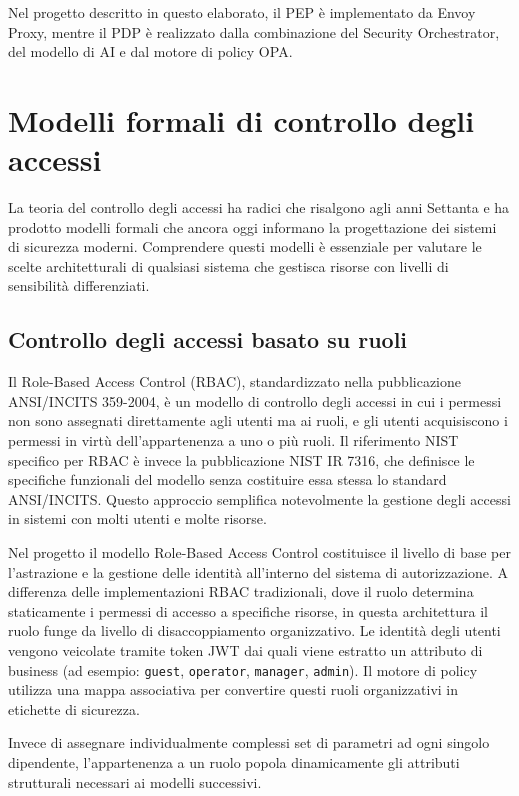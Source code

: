 Nel progetto descritto in questo elaborato, il PEP è implementato da Envoy Proxy, mentre il PDP è realizzato dalla combinazione del Security Orchestrator, del modello di AI e dal motore di policy OPA.

\section{Modelli formali di controllo degli accessi}
\label{sec:Modelli formali di controllo degli accessi}

La teoria del controllo degli accessi ha radici che risalgono agli anni Settanta e ha prodotto modelli formali che ancora oggi informano la progettazione dei sistemi di sicurezza moderni. Comprendere questi modelli è essenziale per valutare le scelte architetturali di qualsiasi sistema che gestisca risorse con livelli di sensibilità differenziati.

\subsection{Controllo degli accessi basato su ruoli}

Il Role-Based Access Control (RBAC), standardizzato nella pubblicazione ANSI/INCITS 359-2004, è un modello di controllo degli accessi in cui i permessi non sono assegnati direttamente agli utenti ma ai ruoli, e gli utenti acquisiscono i permessi in virtù dell'appartenenza a uno o più ruoli. Il riferimento NIST specifico per RBAC è invece la pubblicazione NIST IR 7316, che definisce le specifiche funzionali del modello senza costituire essa stessa lo standard ANSI/INCITS. Questo approccio semplifica notevolmente la gestione degli accessi in sistemi con molti utenti e molte risorse.

Nel progetto il modello Role-Based Access Control costituisce il livello di base per l'astrazione e la gestione delle identità all'interno del sistema di autorizzazione. A differenza delle implementazioni RBAC tradizionali, dove il ruolo determina staticamente i permessi di accesso a specifiche risorse, in questa architettura il ruolo funge da livello di disaccoppiamento organizzativo.
Le identità degli utenti vengono veicolate tramite token JWT dai quali viene estratto un attributo di business (ad esempio: \texttt{guest}, \texttt{operator}, \texttt{manager}, \texttt{admin}). Il motore di policy utilizza una mappa associativa per convertire questi ruoli organizzativi in etichette di sicurezza. 

Invece di assegnare individualmente complessi set di parametri ad ogni singolo dipendente, l'appartenenza a un ruolo popola dinamicamente gli attributi strutturali necessari ai modelli successivi.

